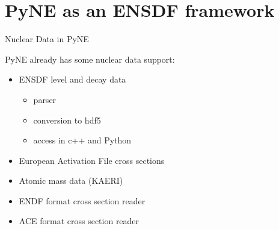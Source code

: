 \documentclass[xcolor=x11names,compress]{beamer}
\renewcommand{\(}{\begin{columns}}
\renewcommand{\)}{\end{columns}}
\newcommand{\<}[1]{\begin{column}{#1}}
\renewcommand{\>}{\end{column}}
\begin{document}
\section{PyNE as an ENSDF framework}
\begin{frame}{Nuclear Data in PyNE}

    PyNE already has some nuclear data support:
    \vspace*{1 em}
    \begin{itemize}
      \item ENSDF \alert{level} and \alert{decay} data
      \begin{itemize}
        \item parser
        \item conversion to hdf5
        \item access in c++ and Python
      \end{itemize}
      \item European Activation File cross sections
      \item Atomic mass data (KAERI)
      \item ENDF format cross section reader
      \item ACE format cross section reader
    \end{itemize}
\end{frame}
\end{document}
